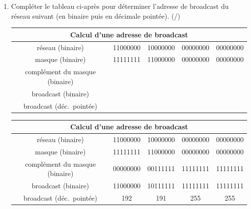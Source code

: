 \begin{enumerate}[resume=monDS]
    \item Compléter le tableau ci-après pour déterminer l'adresse de broadcast du réseau suivant (en binaire puis en décimale pointée). (/)

    \begin{blocvisiblex}[height=5]
    {\centering
    \renewcommand{\arraystretch}{1.5} %
    \begin{tabular}{|c|c|c|c|c|}
        \hline
        \multicolumn{5}{|c|}{\textbf{Calcul d’une adresse de broadcast}} \\ \hline
        réseau (binaire) & 11000000 & 10000000 & 00000000 & 00000000 \\ \hline
        masque (binaire) & 11111111 & 11000000 & 00000000 & 00000000 \\ \hline
        complément du masque (binaire) & & & & \\ \hline
        broadcast (binaire) & & & & \\ \hline
        broadcast (déc.\ pointée) & & & & \\ \hline
    \end{tabular}}
    \centering
    \renewcommand{\arraystretch}{1.5} %
    \begin{tabular}{|c|c|c|c|c|}
        \hline
        \multicolumn{5}{|c|}{\textbf{Calcul d'une adresse de broadcast}} \\ \hline
        réseau (binaire) & 11000000 & 10000000 & 00000000 & 00000000 \\ \hline
        masque (binaire) & 11111111 & 11000000 & 00000000 & 00000000 \\ \hline
        complément du masque (binaire) & 00000000 & 00111111 & 11111111 & 11111111 \\ \hline
        broadcast (binaire) & 11000000 & 10111111 & 11111111 & 11111111 \\ \hline
        broadcast (déc.\ pointée) & 192 & 191 & 255 & 255 \\ \hline
        
    \end{tabular}
        
    \end{blocvisiblex}
    


\end{enumerate}

\medskip

